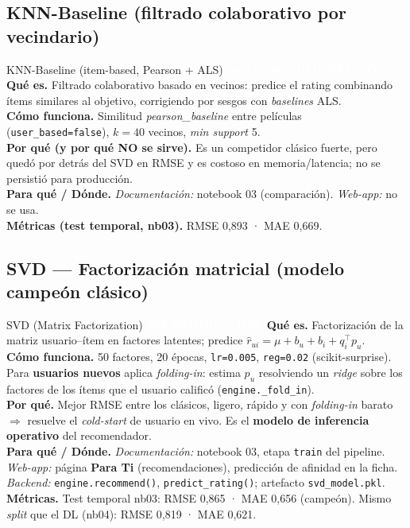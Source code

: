 \documentclass[11pt,a4paper]{article}
\newcommand{\code}[1]{\textcolor{omnidark}{\texttt{#1}}}
\newcommand{\enprod}{\textcolor{white}{\colorbox{omniaccent}{\scriptsize\bfseries\,EN PRODUCCIÓN\,}}}
\newcommand{\noserv}{\textcolor{white}{\colorbox{omnigray}{\scriptsize\bfseries\,SOLO DOCUMENTACIÓN\,}}}
\begin{document}
\subsection{KNN-Baseline (filtrado colaborativo por vecindario)}
\begin{modelcard}{KNN-Baseline (item-based, Pearson + ALS) \hfill \noserv}
\textbf{Qué es.} Filtrado colaborativo basado en vecinos: predice el rating combinando ítems similares al objetivo, corrigiendo por sesgos con \textit{baselines} ALS.\\[3pt]
\textbf{Cómo funciona.} Similitud \textit{pearson\_baseline} entre películas (\code{user\_based=false}), $k=40$ vecinos, \textit{min support} 5.\\[3pt]
\textbf{Por qué (y por qué NO se sirve).} Es un competidor clásico fuerte, pero quedó por detrás del SVD en RMSE y es costoso en memoria/latencia; no se persistió para producción.\\[3pt]
\textbf{Para qué / Dónde.} \emph{Documentación:} notebook 03 (comparación). \emph{Web-app:} no se usa.\\[3pt]
\textbf{Métricas (test temporal, nb03).} RMSE 0,893 · MAE 0,669.
\end{modelcard}

\subsection{SVD — Factorización matricial (modelo campeón clásico)}
\begin{modelcard}{SVD (Matrix Factorization) \hfill \enprod}
\textbf{Qué es.} Factorización de la matriz usuario--ítem en factores latentes; predice $\hat{r}_{ui} = \mu + b_u + b_i + q_i^\top p_u$.\\[3pt]
\textbf{Cómo funciona.} 50 factores, 20 épocas, \code{lr=0.005}, \code{reg=0.02} (scikit-surprise). Para \textbf{usuarios nuevos} aplica \textit{folding-in}: estima $p_u$ resolviendo un \textit{ridge} sobre los factores de los ítems que el usuario calificó (\code{engine.\_fold\_in}).\\[3pt]
\textbf{Por qué.} Mejor RMSE entre los clásicos, ligero, rápido y con \textit{folding-in} barato $\Rightarrow$ resuelve el \textit{cold-start} de usuario en vivo. Es el \textbf{modelo de inferencia operativo} del recomendador.\\[3pt]
\textbf{Para qué / Dónde.} \emph{Documentación:} notebook 03, etapa \code{train} del pipeline. \emph{Web-app:} página \textbf{Para Ti} (recomendaciones), predicción de afinidad en la ficha. \emph{Backend:} \code{engine.recommend()}, \code{predict\_rating()}; artefacto \code{svd\_model.pkl}.\\[3pt]
\textbf{Métricas.} Test temporal nb03: RMSE 0,865 · MAE 0,656 (campeón). Mismo \textit{split} que el DL (nb04): RMSE 0,819 · MAE 0,621.
\end{modelcard}
\end{document}
